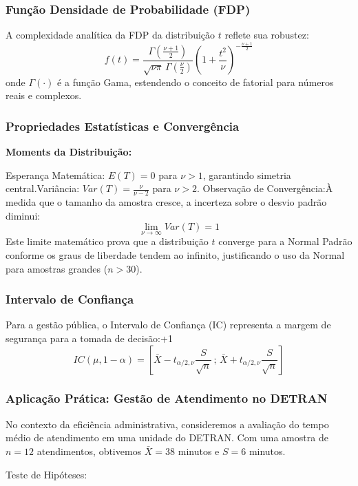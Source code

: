 \subsubsection{Função Densidade de Probabilidade (FDP)}

A complexidade analítica da FDP da distribuição $t$ reflete sua robustez:$$f(t) = \frac{\Gamma\left(\frac{\nu+1}{2}\right)}{\sqrt{\nu\pi}\,\Gamma\left(\frac{\nu}{2}\right)} \left(1+\frac{t^2}{\nu}\right)^{-\frac{\nu+1}{2}}$$onde $\Gamma(\cdot)$ é a função Gama, estendendo o conceito de fatorial para números reais e complexos.


\subsubsection{Propriedades Estatísticas e Convergência} \vskip0.3cm

\textbf{Moments da Distribuição:}  \vskip0.3cm

Esperança Matemática: $E(T) = 0$ para $\nu > 1$, garantindo simetria central.Variância: $Var(T) = \frac{\nu}{\nu - 2}$ para $\nu > 2$. Observação de Convergência:À medida que o tamanho da amostra cresce, a incerteza sobre o desvio padrão diminui:$$\lim_{\nu \to \infty} Var(T) = 1$$Este limite matemático prova que a distribuição $t$ converge para a Normal Padrão conforme os graus de liberdade tendem ao infinito, justificando o uso da Normal para amostras grandes ($n > 30$).

\subsubsection*{Intervalo de Confiança}

Para a gestão pública, o Intervalo de Confiança (IC) representa a margem de segurança para a tomada de decisão:+1$$IC(\mu, 1-\alpha) = \left[ \bar{X} - t_{\alpha/2, \nu} \frac{S}{\sqrt{n}} \, ; \, \bar{X} + t_{\alpha/2, \nu} \frac{S}{\sqrt{n}} \right]$$


\subsubsection*{Aplicação Prática: Gestão de Atendimento no DETRAN}

No contexto da eficiência administrativa, consideremos a avaliação do tempo médio de atendimento em uma unidade do DETRAN. Com uma amostra de $n=12$ atendimentos, obtivemos $\bar{X} = 38$ minutos e $S = 6$ minutos. \vskip0.3cm

Teste de Hipóteses: 

